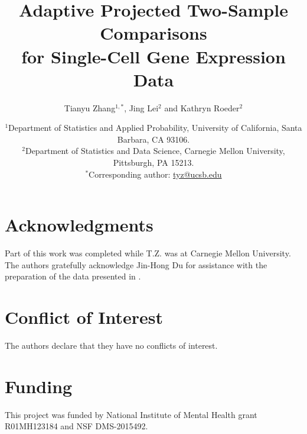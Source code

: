 \documentclass[11pt]{article}
\begin{document}
\title{Adaptive Projected Two-Sample Comparisons \\for Single-Cell Gene Expression Data
}

\author{
  Tianyu Zhang$^{1,*}$,
  Jing Lei$^{2}$ and 
  Kathryn Roeder$^{2}$
}

\date{
  {\small
  $^{1}$Department of Statistics and Applied Probability, University of California, Santa Barbara, CA 93106.\\
  $^{2}$Department of Statistics and Data Science, Carnegie Mellon University, Pittsburgh, PA 15213.\\
  $^{*}$Corresponding author: \url{tyz@ucsb.edu}\\
  }
}

\maketitle

\section*{Acknowledgments}
Part of this work was completed while T.Z. was at Carnegie Mellon University. The authors gratefully acknowledge Jin-Hong Du for assistance with the preparation of the data presented in .

\section*{Conflict of Interest}
The authors declare that they have no conflicts of interest.

\section*{Funding}
 This project was funded by National Institute of Mental Health grant R01MH123184 and NSF DMS-2015492.

\newpage
 
\end{document}
